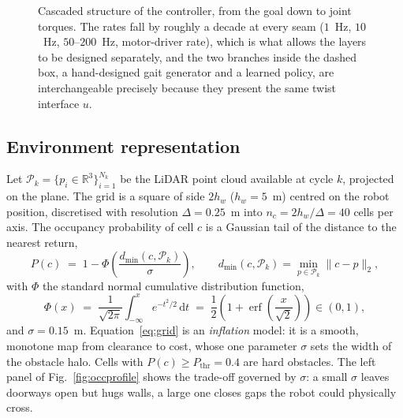 \documentclass[11pt,a4paper]{article}
\newcommand{\R}{\mathbb{R}}
\begin{document}
\begin{figure}[htbp]
  \caption{Cascaded structure of the controller, from the goal down to joint torques. The
  rates fall by roughly a decade at every seam ($1$~Hz, $10$~Hz, $50$--$200$~Hz, motor-driver rate), which is
  what allows the layers to be designed separately, and the two branches inside the dashed box, a
  hand-designed gait generator and a learned policy, are interchangeable precisely because they present the
  same twist interface $u$.}
  \label{fig:cascade}
\end{figure}

\subsection{Environment representation}
\label{sec:grid}

Let $\mathcal{P}_k=\{p_i\in\R^3\}_{i=1}^{N_k}$ be the LiDAR point cloud available at cycle $k$, projected on
the plane. The grid is a square of side $2h_w$ ($h_w=5$~m) centred on the robot position, discretised with
resolution $\Delta=0.25$~m into $n_c=2h_w/\Delta=40$ cells per axis. The occupancy probability of cell $c$ is
a Gaussian tail of the distance to the nearest return,
\begin{equation}
  P(c) \;=\; 1-\Phi\!\left(\frac{d_{\min}(c,\mathcal{P}_k)}{\sigma}\right),
  \qquad d_{\min}(c,\mathcal{P}_k)=\min_{p\in\mathcal{P}_k}\|c-p\|_2 ,
  \label{eq:grid}
\end{equation}
with $\Phi$ the standard normal cumulative distribution function,
\begin{equation}
  \Phi(x) \;=\; \frac{1}{\sqrt{2\pi}}\int_{-\infty}^{x}e^{-t^2/2}\,\mathrm{d}t
  \;=\; \frac{1}{2}\left(1+\operatorname{erf}\!\left(\frac{x}{\sqrt{2}}\right)\right)\in(0,1),
  \label{eq:phi}
\end{equation}
and $\sigma=0.15$~m. Equation~\eqref{eq:grid} is an \emph{inflation}
model: it is a smooth, monotone map from clearance to cost, whose one parameter $\sigma$ sets the width of
the obstacle halo. Cells with $P(c)\ge P_{\mathrm{thr}}=0.4$ are hard obstacles. The left panel of
Fig.~\ref{fig:occprofile} shows the trade-off governed by $\sigma$: a small $\sigma$ leaves doorways open but
hugs walls, a large one closes gaps the robot could physically cross.
\end{document}
